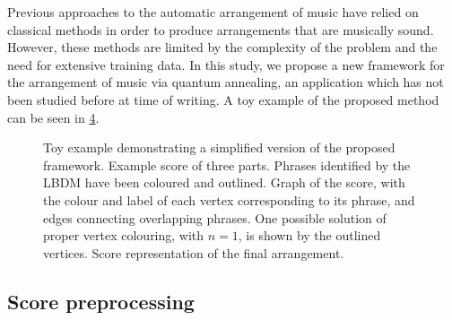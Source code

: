 \documentclass[12pt]{article}
\theoremstyle{definition}
\begin{document}
Previous approaches to the automatic arrangement of music have relied on classical methods in order to produce arrangements that are musically sound. However, these methods are limited by the complexity of the problem and the need for extensive training data. In this study, we propose a new framework for the arrangement of music via quantum annealing, an application which has not been studied before at time of writing. A toy example of the proposed method can be seen in \cref{fig:toy}.

\begin{figure}[!ht]
    \centering\footnotesize
    \begin{subfigure}{\textwidth}
        \centering
        
        \caption{}
        \label{fig:toy-score}
    \end{subfigure}
    \par\bigskip
    \begin{subfigure}{\textwidth}
        \centering
        
        \caption{}
        \label{fig:toy-graph}
    \end{subfigure}
    \par\bigskip
    \begin{subfigure}{\textwidth}
        \centering
        
        \caption{}
        \label{fig:toy-arrangement}
    \end{subfigure}

    \caption{Toy example demonstrating a simplified version of the proposed framework. \textbf{} Example score of three parts. Phrases identified by the LBDM have been coloured and outlined. \textbf{} Graph of the score, with the colour and label of each vertex corresponding to its phrase, and edges connecting overlapping phrases. One possible solution of proper vertex colouring, with $n=1$, is shown by the outlined vertices. \textbf{} Score representation of the final arrangement.}
    \label{fig:toy}
\end{figure}

\subsection{Score preprocessing}
\end{document}
